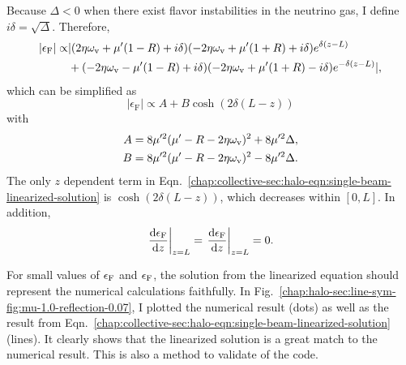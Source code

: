 Because $\Delta < 0$ when there exist flavor instabilities in the neutrino gas, I define $i\delta = \sqrt{\Delta}$. Therefore,
\begin{align}
   \left\vert \epsilon_{\mathrm F} \right\vert \propto & \lvert (2\eta\omega_\vv + \mu'(1-R) +i \delta ) ( -2\eta\omega_\vv + \mu'(1+R) + i \delta ) e^{\delta(z-L)} \nonumber\\
   &+ ( -2\eta\omega_\vv - \mu'(1-R) +i \delta ) ( -2\eta\omega_\vv + \mu'(1+R) - i \delta ) e^{-\delta(z-L)} \rvert,
   \label{chap:collective-sec:halo-eqn:linearized-eom-solution}
\end{align}
which can be simplified as
\begin{equation}
   \left\vert \epsilon_{\mathrm F} \right\vert \propto A + B \cosh( 2\delta(L-z) )
   \label{chap:collective-sec:halo-eqn:single-beam-linearized-solution}
\end{equation}
with
\begin{align}
    A &= 8 \mu'^2 (\mu' - R - 2 \eta\omega_\mathrm v )^2 + 8 \mu'^2 \Delta, \\
    B &= 8 \mu'^2 (\mu' - R - 2 \eta\omega_\mathrm v )^2 - 8 \mu'^2 \Delta .
\end{align}
The only $z$ dependent term in Eqn.~\eqref{chap:collective-sec:halo-eqn:single-beam-linearized-solution} is $\cosh( 2\delta(L-z) )$, which decreases within $[0,L]$. In addition,
\begin{equation}
    \left. \frac{\mathrm d \epsilon_\mathrm F}{\mathrm d z} \right \vert_{z=L} = \left. \frac{\mathrm d \epsilon_\mathrm F}{\mathrm d z} \right \vert_{z=L} = 0.
\end{equation}





For small values of $\epsilon_{\mathrm F}$ and $\epsilon_\mathrm F$, the solution from the linearized equation should represent the numerical calculations faithfully. In Fig.~\ref{chap:halo-sec:line-sym-fig:mu-1.0-reflection-0.07}, I plotted the numerical result (dots) as well as the result from Eqn.~\eqref{chap:collective-sec:halo-eqn:single-beam-linearized-solution} (lines). It clearly shows that the linearized solution is a great match to the numerical result. This is also a method to validate of the code.



